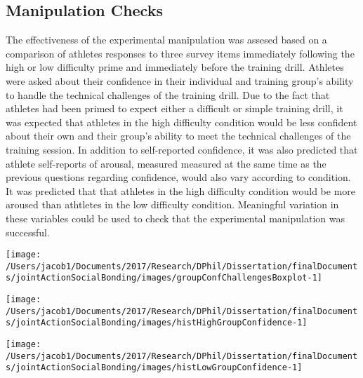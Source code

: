 \documentclass[english]{article}\usepackage[]{graphicx}\usepackage[]{color}
\makeatletter
\def\maxwidth{ %
  \ifdim\Gin@nat@width>\linewidth
    \linewidth
  \else
    \Gin@nat@width
  \fi
}
\newenvironment{knitrout}{}{} %
\makeatother
\begin{document}
\subsection{Manipulation Checks}
The effectiveness of the experimental manipulation was assesed based on a comparison of athletes responses to three survey items immediately following the high or low difficulty prime and immediately before the training drill.
Athletes were asked about their confidence in their individual and training group's ability to handle the technical challenges of the training drill.
Due to the fact that athletes had been primed to expect either a difficult or simple training drill, it was expected that athletes in the high difficulty condition would be less confident about their own and their group's ability to meet the technical challenges of the training session.
In addition to self-reported confidence, it was also predicted that athlete self-reports of arousal, measured measured at the same time as the previous questions regarding confidence, would also vary according to condition.
It was predicted that that athletes in the high difficulty condition would be more aroused than athtletes in the low difficulty condition.  Meaningful variation in these variables could be used to check that the experimental manipulation was successful.










\begin{knitrout}
\color{fgcolor}

{\centering \texttt{[image: /Users/jacob1/Documents/2017/Research/DPhil/Dissertation/finalDocuments/jointActionSocialBonding/images/groupConfChallengesBoxplot-1]} 

}



\end{knitrout}
\begin{knitrout}
\color{fgcolor}

{\centering \texttt{[image: /Users/jacob1/Documents/2017/Research/DPhil/Dissertation/finalDocuments/jointActionSocialBonding/images/histHighGroupConfidence-1]} 

}



\end{knitrout}
\begin{knitrout}
\color{fgcolor}

{\centering \texttt{[image: /Users/jacob1/Documents/2017/Research/DPhil/Dissertation/finalDocuments/jointActionSocialBonding/images/histLowGroupConfidence-1]} 

}



\end{knitrout}
\end{document}
